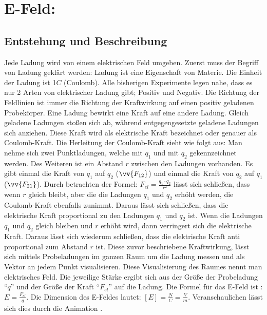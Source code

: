 \section{E-Feld:}
\subsection{Entstehung und Beschreibung}
Jede Ladung wird von einem elektrischen Feld umgeben.
Zuerst muss der Begriff von Ladung geklärt werden:
Ladung ist eine Eigenschaft von Materie.
Die Einheit der Ladung ist 1$C$ (Coulomb).
Alle bisherigen Experimente legen nahe, dass es nur 2 Arten von elektrischer Ladung gibt; Positiv und Negativ.
Die Richtung der Feldlinien ist immer die Richtung der Kraftwirkung auf einen positiv geladenen Probekörper.
Eine Ladung bewirkt eine Kraft auf eine andere Ladung.
Gleich geladene Ladungen stoßen sich ab, während entgegengesetzte geladene Ladungen sich anziehen.
Diese Kraft wird als elektrische Kraft bezeichnet oder genauer als Coulomb-Kraft.
Die Herleitung der Coulomb-Kraft sieht wie folgt aus:
Man nehme sich zwei Punktladungen, welche mit $q_1$ und mit $q_2$ gekennzeichnet werden. 
Des Weiteren ist ein Abstand $r$ zwischen den Ladungen vorhanden.
Es gibt einmal die Kraft von $q_1$ auf $q_2$ ($\vv{F_{12}}$) und einmal die Kraft von $q_2$ auf $q_1$ ($\vv{F_{21}}$).
Durch betrachten der Formel: $F_{el} = \frac{q_1 \cdot q_2}{r^2}$ 
lässt sich schließen, dass wenn $r$ gleich bleibt, aber die die Ladungen $q_1$ und $q_2$ erhöht werden, die Coulomb-Kraft ebenfalls zunimmt.
Daraus lässt sich schließen, dass die elektrische Kraft proportional zu den Ladungen $q_1$ und $q_2$ ist. 
Wenn die Ladungen $q_1$ und $q_2$ gleich bleiben und $r$ erhöht wird, dann verringert sich die elektrische Kraft.
Daraus lässt sich wiederum schließen, dass die elektrische Kraft anti proportional zum Abstand $r$ ist.
Diese zuvor beschriebene Kraftwirkung, lässt sich mittels Probeladungen im ganzen Raum um die Ladung messen und als Vektor an jedem Punkt visualisieren.
Diese Visualisierung des Raumes nennt man elektrisches Feld.
Die jeweilige Stärke ergibt sich aus der Größe der Probeladung "`$q$"' und der Größe der Kraft "`$F_{el}$"' auf die Ladung.
Die Formel für das E-Feld ist : $E = \frac{F_{el}}{q}$.
Die Dimension des E-Feldes lautet: $[E] = \frac{N}{C} = \frac{V}{m}$.
Veranschaulichen lässt sich dies durch die Animation \cite{Animation}.

